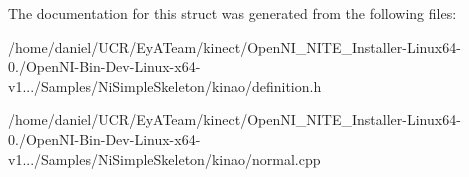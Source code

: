 The documentation for this struct was generated from the following files\-:\begin{DoxyCompactItemize}
\item 
/home/daniel/\-U\-C\-R/\-Ey\-A\-Team/kinect/\-Open\-N\-I\-\_\-\-N\-I\-T\-E\-\_\-\-Installer-\/\-Linux64-\/0./\-Open\-N\-I-\/\-Bin-\/\-Dev-\/\-Linux-\/x64-\/v1.../\-Samples/\-Ni\-Simple\-Skeleton/kinao/definition.\-h\item 
/home/daniel/\-U\-C\-R/\-Ey\-A\-Team/kinect/\-Open\-N\-I\-\_\-\-N\-I\-T\-E\-\_\-\-Installer-\/\-Linux64-\/0./\-Open\-N\-I-\/\-Bin-\/\-Dev-\/\-Linux-\/x64-\/v1.../\-Samples/\-Ni\-Simple\-Skeleton/kinao/normal.\-cpp\end{DoxyCompactItemize}
